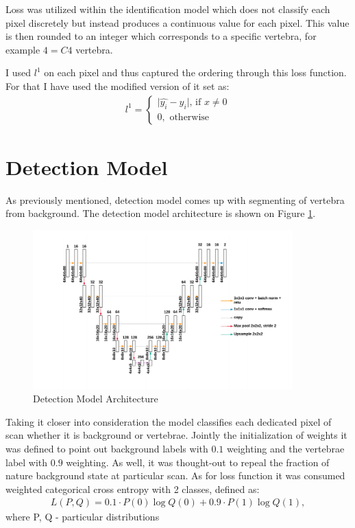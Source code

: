 Loss was utilized within the identification model which does not classify each pixel discretely but instead produces a continuous value for each pixel. This value is then rounded to an integer which corresponds to a specific vertebra, for example $4 = C4$ vertebra. 

I used $l^{1}$ on each pixel and thus captured the ordering through this loss function. For that I have used the modified version of it set as: 
\begin{align*}
 \text{$l^{1}$} = \begin{cases} \lvert \hat{y_i} - y_i \rvert \mbox{, if } x\mbox{$\neq 0$} \\ 0, \mbox{ otherwise} \end{cases}
\end{align*}


\section{Detection Model}
As previously mentioned, detection model comes up with segmenting of vertebra from background. The detection model architecture is shown on Figure \ref{fig:detection_model}.

\begin{figure}[h]
    \centering \includegraphics[width=10cm]{images/detection_model.png}
    \caption {Detection Model Architecture}
    \label{fig:detection_model}
\end{figure}

Taking it closer into consideration the model classifies each dedicated pixel of scan whether it is background or vertebrae. Jointly the initialization of weights it was  defined to point out background labels with $0.1$ weighting and the vertebrae label with $0.9$ weighting. As well, it was thought-out to repeal the fraction of nature background state at particular scan. As for loss function it was consumed weighted categorical cross entropy with 2 classes, defined as:
\begin{align*}
 L(P, Q) = 0.1 \cdot P(0)\log Q(0) + 0.9 \cdot P(1)\log Q(1),
\end{align*}
where P, Q - particular distributions 

